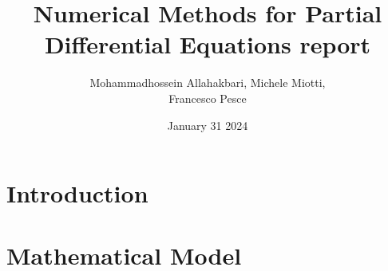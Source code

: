 \documentclass{article}
\title{Numerical Methods for Partial Differential Equations report}
\author{Mohammadhossein Allahakbari, Michele Miotti, \\Francesco Pesce}
\date{January 31 2024}
\begin{document}
\maketitle


\section{Introduction}
	

\section{Mathematical Model}
	


%
%
\end{document}
